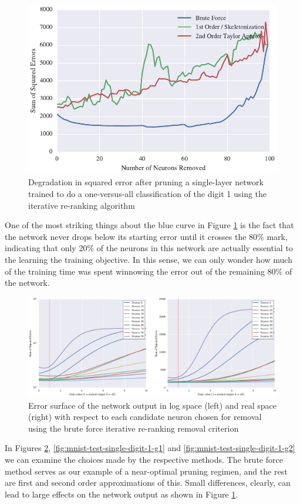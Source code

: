 \begin{figure}[!ht]
\centering
\includegraphics[width=0.5\linewidth]{png/mnist-test-single-digit-1.pdf}
\caption{Degradation in squared error after pruning a single-layer network trained to do a one-versus-all classification of the digit 1 using the iterative re-ranking algorithm}
\label{fig:mnist-test-single-digit-1}
\end{figure}

One of the most striking things about the blue curve in Figure \ref{fig:mnist-test-single-digit-1} is the fact that the network never drops below its starting error until it crosses the 80\% mark, indicating that only 20\% of the neurons in this network are actually essential to the learning the training objective. In this sense, we can only wonder how much of the training time was spent winnowing the error out of the remaining 80\% of the network. 

\begin{figure}[!ht]
\centering
\includegraphics[width=\linewidth]{png/mnist-test-single-digit-1-gt.pdf}
\caption{Error surface of the network output in log space (left) and real space (right) with respect to each candidate neuron chosen for removal using the brute force iterative re-ranking removal criterion}
\label{fig:mnist-test-single-digit-1-gt}
\end{figure}

In Figures \ref{fig:mnist-test-single-digit-1-gt}, \ref{fig:mnist-test-single-digit-1-g1} and \ref{fig:mnist-test-single-digit-1-g2} we can examine the choices made by the respective methods. The brute force method serves as our example of a near-optimal pruning regimen, and the rest are first and second order approximations of this. Small differences, clearly, can lead to large effects on the network output as shown in Figure \ref{fig:mnist-test-single-digit-1}.

